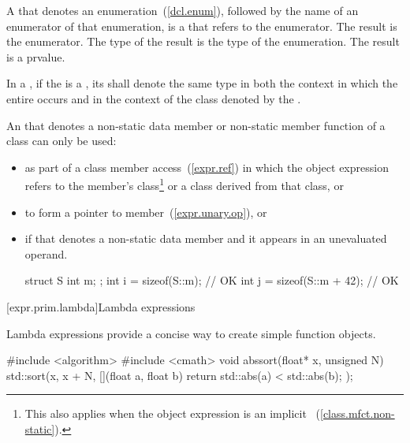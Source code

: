 \pnum
A  that denotes an
enumeration~(\ref{dcl.enum}), followed by the name of an
enumerator of that enumeration, is a 
that refers to the enumerator. The result is the enumerator. The type
of the result is the type of the enumeration. The result is a prvalue.

\pnum
In a , if the
is a
, its 
shall denote the same type in both the context in which the entire
 occurs and in the context of the class denoted
by the .

\pnum
An  that denotes a non-static data member or
non-static member function of a class can only be used:

\begin{itemize}
\item as part of a class member access~(\ref{expr.ref}) in which the
object expression
refers to the member's class\footnote{This also applies when the object expression
is an implicit ~(\ref{class.mfct.non-static}).} or a class derived from
that class, or

\item to form a pointer to member~(\ref{expr.unary.op}), or

\item if that  denotes a non-static data member
and it appears in an unevaluated operand.
\enterexample

\begin{codeblock}
struct S {
  int m;
};
int i = sizeof(S::m);           // OK
int j = sizeof(S::m + 42);      // OK
\end{codeblock}
\exitexample
\end{itemize}

[expr.prim.lambda]{Lambda expressions}%

\pnum
Lambda expressions provide a concise way to create simple function objects.
\enterexample

\begin{codeblock}
#include <algorithm>
#include <cmath>
void abssort(float* x, unsigned N) {
  std::sort(x, x + N,
    [](float a, float b) {
      return std::abs(a) < std::abs(b);
    });
}
\end{codeblock}
\exitexample

